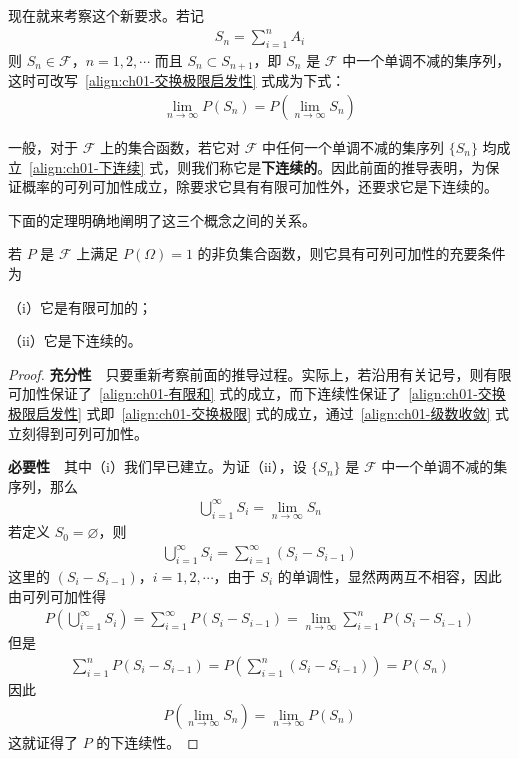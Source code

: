 \documentclass[../../main.tex]{subfiles}
\begin{document}
现在就来考察这个新要求。若记
\begin{align*}
S_n=\sum_{i=1}^{n}A_i
\end{align*}
则 $S_n\in\mathscr{F}$，$n=1,2,\cdots$ 而且 $S_n\subset S_{n+1}$，即 $S_n$ 是 $\mathscr{F}$ 中一个单调不减的集序列，这时可改写~\eqref{align:ch01-交换极限启发性} 式成为下式：
\begin{align}
\lim_{n\to\infty}P(S_n)=P\left(\lim_{n\to\infty}S_n\right)\label{align:ch01-下连续}
\end{align}

一般，对于 $\mathscr{F}$ 上的集合函数，若它对 $\mathscr{F}$ 中任何一个单调不减的集序列 $\{S_n\}$ 均成立~\eqref{align:ch01-下连续} 式，则我们称它是\textbf{下连续的}。因此前面的推导表明，为保证概率的可列可加性成立，除要求它具有有限可加性外，还要求它是下连续的。

下面的定理明确地阐明了这三个概念之间的关系。

\begin{theorem}[可列可加性充要条件]\label{theorem:ch01-可列可加充要条件}
若 $P$ 是 $\mathscr{F}$ 上满足 $P(\Omega)=1$ 的非负集合函数，则它具有可列可加性的充要条件为

（i）它是有限可加的；

（ii）它是下连续的。
\end{theorem}

\begin{proof}
\textbf{充分性}~~只要重新考察前面的推导过程。实际上，若沿用有关记号，则有限可加性保证了~\eqref{align:ch01-有限和} 式的成立，而下连续性保证了~\eqref{align:ch01-交换极限启发性} 式即~\eqref{align:ch01-交换极限} 式的成立，通过~\eqref{align:ch01-级数收敛} 式立刻得到可列可加性。

\textbf{必要性}~~其中（i）我们早已建立。为证（ii），设 $\{S_n\}$ 是 $\mathscr{F}$ 中一个单调不减的集序列，那么
\begin{align*}
\bigcup_{i=1}^{\infty}S_i=\lim_{n\to\infty}S_n
\end{align*}
若定义 $S_0=\varnothing$，则
\begin{align*}
\bigcup_{i=1}^{\infty}S_i=\sum_{i=1}^{\infty}(S_i-S_{i-1})
\end{align*}
这里的 $(S_i-S_{i-1})$，$i=1,2,\cdots$，由于 $S_i$ 的单调性，显然两两互不相容，因此由可列可加性得
\begin{align*}
P\left(\bigcup_{i=1}^{\infty}S_i\right)=\sum_{i=1}^{\infty}P(S_i-S_{i-1})=\lim_{n\to\infty}\sum_{i=1}^{n}P(S_i-S_{i-1})
\end{align*}
但是
\begin{align*}
\sum_{i=1}^{n}P(S_i-S_{i-1})=P\left(\sum_{i=1}^{n}(S_i-S_{i-1})\right)=P(S_n)
\end{align*}
因此
\begin{align*}
P\left(\lim_{n\to\infty}S_n\right)=\lim_{n\to\infty}P(S_n)
\end{align*}
这就证得了 $P$ 的下连续性。
\end{proof}
\end{document}
